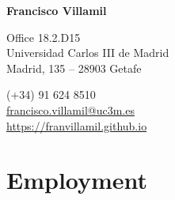\documentclass[a4paper, 12pt]{article}
\begin{document}

\begin{center}
{\bfseries\Large Francisco Villamil}
\end{center}

\vspace{0pt}

\noindent
\begin{minipage}[t]{0.47\textwidth}\small
\flushright
	Office 18.2.D15\\
	Universidad Carlos III de Madrid\\
	Madrid, 135 -- 28903 Getafe\\
\end{minipage}\hfill
\begin{minipage}[t]{0.47\textwidth}\small
	 \hspace{5pt} (+34) 91 624 8510\\
	 \hspace{5pt} \href{mailto:francisco.villamil@uc3m.es}{francisco.villamil@uc3m.es}\\
	 \hspace{5pt} \href{https://franvillamil.github.io}{https://franvillamil.github.io}\\
\end{minipage}


\vspace{-10pt}
\section*{Employment}
\end{document}

